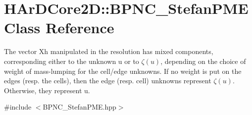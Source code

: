 \hypertarget{classHArDCore2D_1_1BPNC__StefanPME}{}\section{H\+Ar\+D\+Core2D\+:\+:B\+P\+N\+C\+\_\+\+Stefan\+P\+ME Class Reference}
\label{classHArDCore2D_1_1BPNC__StefanPME}


The vector Xh manipulated in the resolution has mixed components, corresponding either to the unknown u or to $\zeta(u)$, depending on the choice of weight of mass-\/lumping for the cell/edge unknowns. If no weight is put on the edges (resp. the cells), then the edge (resp. cell) unknowns represent $\zeta(u)$. Otherwise, they represent u.  




{\ttfamily \#include $<$B\+P\+N\+C\+\_\+\+Stefan\+P\+M\+E.\+hpp$>$}

